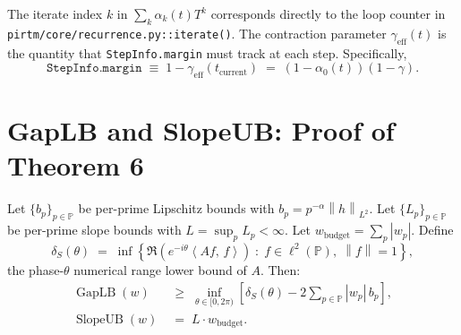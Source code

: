\documentclass[12pt,letterpaper]{article}
\theoremstyle{definition}
\theoremstyle{remark}
\DeclareMathOperator{\GapLB}{GapLB}
\DeclareMathOperator{\SlopeUB}{SlopeUB}
\newcommand{\PP}{\mathbb{P}}
\newcommand{\norm}[1]{\left\|#1\right\|}
\newcommand{\ip}[2]{\left\langle #1,\, #2 \right\rangle}
\newcommand{\abs}[1]{\left|#1\right|}
\newcommand{\lp}{\ell^2(\PP)}
\begin{document}
\begin{appremark}
The iterate index $k$ in $\sum_k \alpha_k(t) T^k$ corresponds directly to
the loop counter in \texttt{pirtm/core/recurrence.py::iterate()}.
The contraction parameter $\gamma_{\mathrm{eff}}(t)$ is the quantity
that \texttt{StepInfo.margin} must track at each step. Specifically,
\[
  \texttt{StepInfo.margin}
  \;\equiv\;
  1 - \gamma_{\mathrm{eff}}(t_{\mathrm{current}})
  \;=\;
  (1 - \alpha_0(t))(1 - \gamma).
\]
\end{appremark}

\section{GapLB and SlopeUB: Proof of Theorem 6}
\label{app:gaplb}

\begin{apptheorem}
\label{thm:gaplb-full}
Let $\{b_p\}_{p \in \PP}$ be per-prime Lipschitz bounds with
$b_p = p^{-\alpha}\norm{h}_{L^2}$. Let $\{L_p\}_{p \in \PP}$ be per-prime
slope bounds with $L = \sup_p L_p < \infty$. Let
$w_{\mathrm{budget}} = \sum_p \abs{w_p}$. Define
\[
  \delta_S(\theta)
  \;=\;
  \inf\!\left\{
    \Re\!\left(e^{-i\theta}\ip{Af}{f}\right)
    \;\colon\; f \in \lp,\; \norm{f} = 1
  \right\},
\]
the phase-$\theta$ numerical range lower bound of $A$. Then:
\begin{align}
  \GapLB(w)
  &\;\geq\;
  \inf_{\theta \in [0,2\pi)}
  \left[\delta_S(\theta) - 2\sum_{p \in \PP} \abs{w_p}\, b_p \right],
  \label{eq:gaplb} \\[6pt]
  \SlopeUB(w)
  &\;=\; L \cdot w_{\mathrm{budget}}.
  \label{eq:slopeub}
\end{align}
\end{apptheorem}
\end{document}
